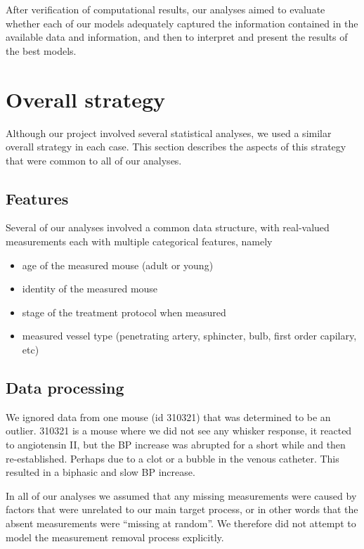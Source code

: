 \documentclass[
  letterpaper,
  DIV=11,
  numbers=noendperiod,
  oneside]{scrartcl}
\providecommand{\tightlist}{%
  \setlength{\itemsep}{0pt}\setlength{\parskip}{0pt}}\usepackage{longtable,booktabs,array}
\theoremstyle{plain}
\theoremstyle{remark}
\begin{document}
After verification of computational results, our analyses aimed to
evaluate whether each of our models adequately captured the information
contained in the available data and information, and then to interpret
and present the results of the best models.

\section{Overall strategy}\label{overall-strategy}

Although our project involved several statistical analyses, we used a
similar overall strategy in each case. This section describes the
aspects of this strategy that were common to all of our analyses.

\subsection{Features}\label{features}

Several of our analyses involved a common data structure, with
real-valued measurements each with multiple categorical features, namely

\begin{itemize}
\tightlist
\item
  age of the measured mouse (adult or young)
\item
  identity of the measured mouse
\item
  stage of the treatment protocol when measured
\item
  measured vessel type (penetrating artery, sphincter, bulb, first order
  capilary, etc)
\end{itemize}

\subsection{Data processing}\label{data-processing}

We ignored data from one mouse (id 310321) that was determined to be an
outlier. 310321 is a mouse where we did not see any whisker response, it
reacted to angiotensin II, but the BP increase was abrupted for a short
while and then re-established. Perhaps due to a clot or a bubble in the
venous catheter. This resulted in a biphasic and slow BP increase.

In all of our analyses we assumed that any missing measurements were
caused by factors that were unrelated to our main target process, or in
other words that the absent measurements were ``missing at random''. We
therefore did not attempt to model the measurement removal process
explicitly.
\end{document}
